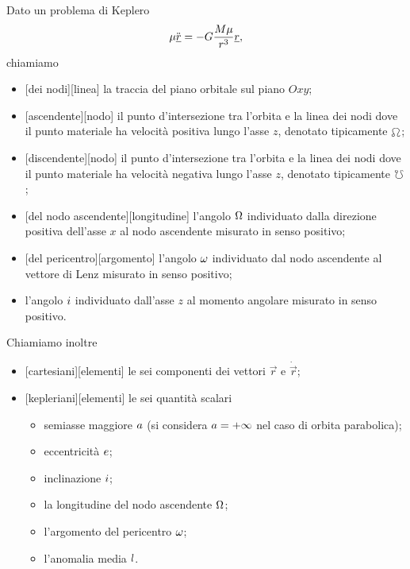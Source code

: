 \begin{Definition}
  Dato un problema di Keplero
	\[
		\mu \ddot{\underline{r}}
    = - G \frac{M\mu}{r^3}\underline{r},
	\]
  chiamiamo
  \begin{itemize}
    \item {}[dei nodi][linea] la traccia del piano
      orbitale sul piano $Oxy$;
    \item {}[ascendente][nodo] il punto
      d'intersezione tra l'orbita e la linea dei nodi dove il punto
      materiale ha velocit\`a positiva lungo l'asse $z$, denotato
      tipicamente $\AscendingNode$;
    \item {}[discendente][nodo] il punto
      d'intersezione tra l'orbita e la linea dei nodi dove il punto
      materiale ha velocit\`a negativa lungo l'asse $z$, denotato
      tipicamente $\DescendingNode$;
    \item {}[del nodo ascendente][longitudine]
      l'angolo $\Omega$ individuato dalla
      direzione positiva dell'asse $x$ al nodo ascendente misurato in
      senso positivo;
    \item {}[del pericentro][argomento]
      l'angolo $\omega$ individuato dal nodo ascendente
      al vettore di Lenz misurato in senso positivo;
    \item {} l'angolo $i$ individuato
      dall'asse $z$ al momento angolare misurato in senso positivo.
  \end{itemize}
  Chiamiamo inoltre
  \begin{itemize}
    \item {}[cartesiani][elementi] le sei
    componenti dei vettori $\vec{r}$ e $\dot{\vec{r}}$;
    \item {}[kepleriani][elementi]
      le sei quantit\`a scalari
      \begin{itemize}
        \item semiasse maggiore $a$
          (si considera $a = + \infty$ nel
          caso di orbita parabolica);
        \item eccentricit\`a $e$;
        \item inclinazione $i$;
        \item la longitudine del nodo ascendente
          $\Omega$;
        \item l'argomento del pericentro $\omega$;
        \item l'anomalia media $l$.
      \end{itemize}
  \end{itemize}
\end{Definition}
